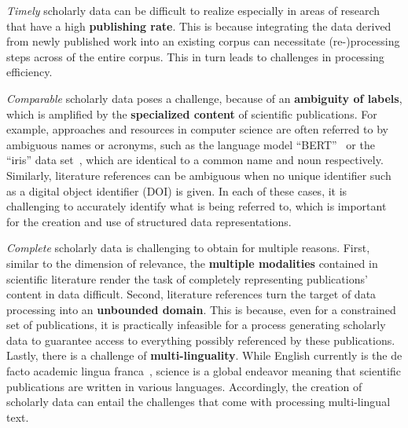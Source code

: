 \textit{Timely} scholarly data can be difficult to realize especially in areas of research that have a high \textbf{publishing rate}. This is because integrating the data derived from newly published work into an existing corpus can necessitate (re-)processing steps across of the entire corpus. This in turn leads to challenges in processing efficiency.

\textit{Comparable} scholarly data poses a challenge, because of an \textbf{ambiguity of labels}, which is amplified by the \textbf{specialized content} of scientific publications. For example, approaches and resources in computer science are often referred to by ambiguous names or acronyms, such as the language model ``BERT''~\cite{devlin2019} or the ``iris'' data set~\cite{Fisher1936}, which are identical to a common name and noun respectively. Similarly, literature references can be ambiguous when no unique identifier such as a digital object identifier (DOI) is given. In each of these cases, it is challenging to accurately identify what is being referred to, which is important for the creation and use of structured data representations.

\textit{Complete} scholarly data is challenging to obtain for multiple reasons. First, similar to the dimension of relevance, the \textbf{multiple modalities} contained in scientific literature render the task of completely representing publications' content in data difficult. Second, literature references turn the target of data processing into an \textbf{unbounded domain}. This is because, even for a constrained set of publications, it is practically infeasible for a process generating scholarly data to guarantee access to everything possibly referenced by these publications. Lastly, there is a challenge of \textbf{multi-linguality}. While English currently is the de facto academic lingua franca~\cite{Montgomery2013}, science is a global endeavor meaning that scientific publications are written in various languages. Accordingly, the creation of scholarly data can entail the challenges that come with processing multi-lingual text.
 

